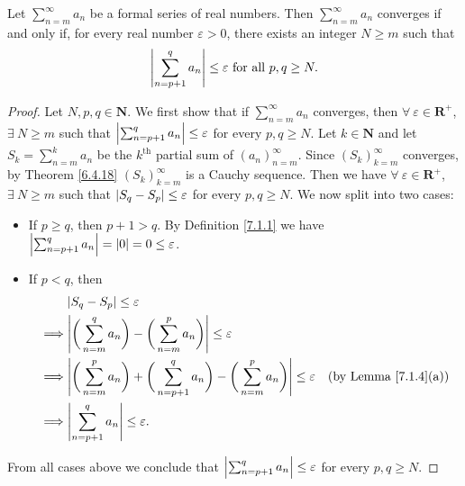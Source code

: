 \setcounter{theorem}{4}
\begin{proposition}\label{7.2.5}
    Let \(\sum_{n = m}^\infty a_n\) be a formal series of real numbers.
    Then \(\sum_{n = m}^\infty a_n\) converges if and only if, for every real number \(\varepsilon > 0\), there exists an integer \(N \geq m\) such that
    \[
        \abs*{\sum_{n = p + 1}^q a_n} \leq \varepsilon \text{ for all } p, q \geq N.
    \]
\end{proposition}

\begin{proof}
    Let \(N, p, q \in \mathbf{N}\).
    We first show that if \(\sum_{n = m}^\infty a_n\) converges, then \(\forall\ \varepsilon \in \mathbf{R}^+\), \(\exists\ N \geq m\) such that \(\abs*{\sum_{n = p + 1}^q a_n} \leq \varepsilon\) for every \(p, q \geq N\).
    Let \(k \in \mathbf{N}\) and let \(S_k = \sum_{n = m}^k a_n\) be the \(k^{\text{th}}\) partial sum of \((a_n)_{n = m}^\infty\).
    Since \((S_k)_{k = m}^\infty\) converges, by Theorem \ref{6.4.18} \((S_k)_{k = m}^\infty\) is a Cauchy sequence.
    Then we have \(\forall\ \varepsilon \in \mathbf{R}^+\), \(\exists\ N \geq m\) such that \(\abs*{S_q - S_p} \leq \varepsilon\) for every \(p, q \geq N\).
    We now split into two cases:
    \begin{itemize}
        \item If \(p \geq q\), then \(p + 1 > q\).
              By Definition \ref{7.1.1} we have \(\abs*{\sum_{n = p + 1}^q a_n} = \abs*{0} = 0 \leq \varepsilon\).
        \item If \(p < q\), then
              \begin{align*}
                           & \abs*{S_q - S_p} \leq \varepsilon                                                                                                                               \\
                  \implies & \abs*{\bigg(\sum_{n = m}^q a_n\bigg) - \bigg(\sum_{n = m}^p a_n\bigg)} \leq \varepsilon                                                                         \\
                  \implies & \abs*{\bigg(\sum_{n = m}^p a_n\bigg) + \bigg(\sum_{n = p + 1}^q a_n\bigg) - \bigg(\sum_{n = m}^p a_n\bigg)} \leq \varepsilon & \text{(by Lemma \ref{7.1.4}(a))} \\
                  \implies & \abs*{\sum_{n = p + 1}^q a_n} \leq \varepsilon.
              \end{align*}
    \end{itemize}
    From all cases above we conclude that \(\abs*{\sum_{n = p + 1}^q a_n} \leq \varepsilon\) for every \(p, q \geq N\).


\end{proof}
